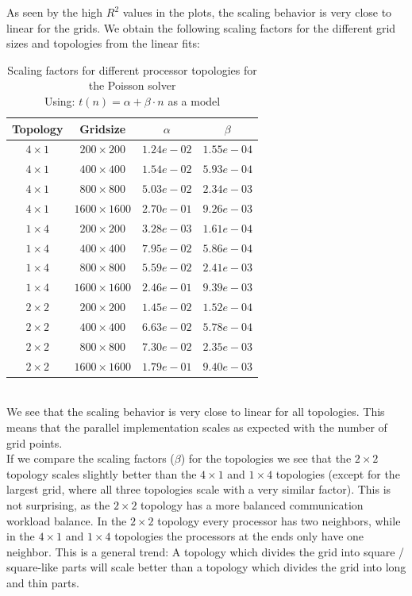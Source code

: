 As seen by the high $R^2$ values in the plots, the scaling behavior is very close to linear for the grids. We obtain the following scaling factors for the different grid sizes and topologies from the linear fits:
\begin{table}[H]
    \centering
    \caption{Scaling factors for different processor topologies for the Poisson solver\\Using: $t(n) = \alpha + \beta \cdot n$ as a model}
    \begin{tabular}{|c|c|c|c|}
        \hline
        Topology & Gridsize & $\alpha$ & $\beta$ \\\hline
        $4\times 1$ & $200\times 200$ & $1.24e-02$ & $1.55e-04$ \\ \hline
        $4\times 1$ & $400\times 400$ & $1.54e-02$ & $5.93e-04$ \\ \hline
        $4\times 1$ & $800\times 800$ & $5.03e-02$ & $2.34e-03$ \\ \hline
        $4\times 1$ & $1600\times 1600$ & $2.70e-01$ & $9.26e-03$ \\ \hline
        $1\times 4$ & $200\times 200$ & $3.28e-03$ & $1.61e-04$ \\ \hline
        $1\times 4$ & $400\times 400$ & $7.95e-02$ & $5.86e-04$ \\ \hline
        $1\times 4$ & $800\times 800$ & $5.59e-02$ & $2.41e-03$ \\ \hline
        $1\times 4$ & $1600\times 1600$ & $2.46e-01$ & $9.39e-03$ \\ \hline
        $2\times 2$ & $200\times 200$ & $1.45e-02$ & $1.52e-04$ \\ \hline
        $2\times 2$ & $400\times 400$ & $6.63e-02$ & $5.78e-04$ \\ \hline
        $2\times 2$ & $800\times 800$ & $7.30e-02$ & $2.35e-03$ \\ \hline
        $2\times 2$ & $1600\times 1600$ & $1.79e-01$ & $9.40e-03$ \\ \hline
    \end{tabular}
\end{table}
\\
We see that the scaling behavior is very close to linear for all topologies. This means that the parallel implementation scales as expected with the number of grid points.\\
If we compare the scaling factors ($\beta$) for the topologies we see that the $2\times 2$ topology scales slightly better than the $4\times 1$ and $1\times 4$ topologies (except for the largest grid, where all three topologies scale with a very similar factor). This is not surprising, as the $2\times 2$ topology has a more balanced communication workload balance. In the $2\times 2$ topology every processor has two neighbors, while in the $4\times 1$ and $1\times 4$ topologies the processors at the ends only have one neighbor. This is a general trend: A topology which divides the grid into square / square-like parts will scale better than a topology which divides the grid into long and thin parts.\\
